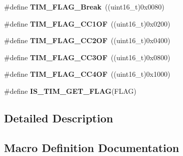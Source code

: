 \begin{DoxyCompactItemize}
\item 
\hypertarget{group___t_i_m___flags_ga166571a1d5ca2bfca5d923eaa22f6deb}{}\#define {\bfseries T\+I\+M\+\_\+\+F\+L\+A\+G\+\_\+\+Break}~((uint16\+\_\+t)0x0080)\label{group___t_i_m___flags_ga166571a1d5ca2bfca5d923eaa22f6deb}

\item 
\hypertarget{group___t_i_m___flags_ga38dfb7d1ed00af77d70bc3be28500108}{}\#define {\bfseries T\+I\+M\+\_\+\+F\+L\+A\+G\+\_\+\+C\+C1\+O\+F}~((uint16\+\_\+t)0x0200)\label{group___t_i_m___flags_ga38dfb7d1ed00af77d70bc3be28500108}

\item 
\hypertarget{group___t_i_m___flags_ga4df0c71d3e695c214d49802942e04590}{}\#define {\bfseries T\+I\+M\+\_\+\+F\+L\+A\+G\+\_\+\+C\+C2\+O\+F}~((uint16\+\_\+t)0x0400)\label{group___t_i_m___flags_ga4df0c71d3e695c214d49802942e04590}

\item 
\hypertarget{group___t_i_m___flags_gac81f24eaffdf83c2db9d2e6078a00919}{}\#define {\bfseries T\+I\+M\+\_\+\+F\+L\+A\+G\+\_\+\+C\+C3\+O\+F}~((uint16\+\_\+t)0x0800)\label{group___t_i_m___flags_gac81f24eaffdf83c2db9d2e6078a00919}

\item 
\hypertarget{group___t_i_m___flags_gafc8b04654766d98ba2c6fed601895a20}{}\#define {\bfseries T\+I\+M\+\_\+\+F\+L\+A\+G\+\_\+\+C\+C4\+O\+F}~((uint16\+\_\+t)0x1000)\label{group___t_i_m___flags_gafc8b04654766d98ba2c6fed601895a20}

\item 
\#define {\bfseries I\+S\+\_\+\+T\+I\+M\+\_\+\+G\+E\+T\+\_\+\+F\+L\+A\+G}(F\+L\+A\+G)
\end{DoxyCompactItemize}


\subsection{Detailed Description}


\subsection{Macro Definition Documentation}
\hypertarget{group___t_i_m___flags_ga6406de8131ae53ee29740c3e8627b098}{}

